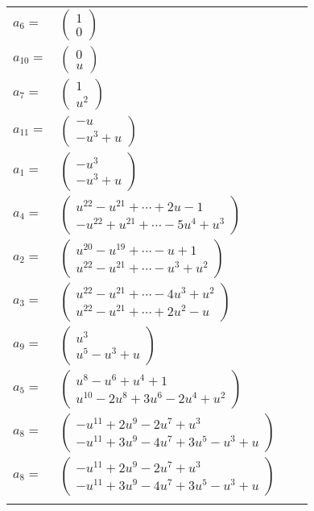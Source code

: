 \documentclass[1p]{elsarticle_modified}
\theoremstyle{definition}
\begin{document}
\begin{tabular}{m{7pt} m{180pt} m{7pt} m{180pt} }
\flushright $a_{6}=$&$\begin{pmatrix}1\\0\end{pmatrix}$ \\
\flushright $a_{10}=$&$\begin{pmatrix}0\\u\end{pmatrix}$ \\
\flushright $a_{7}=$&$\begin{pmatrix}1\\u^2\end{pmatrix}$ \\
\flushright $a_{11}=$&$\begin{pmatrix}- u\\- u^3+u\end{pmatrix}$ \\
\flushright $a_{1}=$&$\begin{pmatrix}- u^3\\- u^3+u\end{pmatrix}$ \\
\flushright $a_{4}=$&$\begin{pmatrix}u^{22}- u^{21}+\cdots+2 u-1\\- u^{22}+u^{21}+\cdots-5 u^4+u^3\end{pmatrix}$ \\
\flushright $a_{2}=$&$\begin{pmatrix}u^{20}- u^{19}+\cdots- u+1\\u^{22}- u^{21}+\cdots- u^3+u^2\end{pmatrix}$ \\
\flushright $a_{3}=$&$\begin{pmatrix}u^{22}- u^{21}+\cdots-4 u^3+u^2\\u^{22}- u^{21}+\cdots+2 u^2- u\end{pmatrix}$ \\
\flushright $a_{9}=$&$\begin{pmatrix}u^3\\u^5- u^3+u\end{pmatrix}$ \\
\flushright $a_{5}=$&$\begin{pmatrix}u^8- u^6+u^4+1\\u^{10}-2 u^8+3 u^6-2 u^4+u^2\end{pmatrix}$ \\
\flushright $a_{8}=$&$\begin{pmatrix}- u^{11}+2 u^9-2 u^7+u^3\\- u^{11}+3 u^9-4 u^7+3 u^5- u^3+u\end{pmatrix}$\\ \flushright $a_{8}=$&$\begin{pmatrix}- u^{11}+2 u^9-2 u^7+u^3\\- u^{11}+3 u^9-4 u^7+3 u^5- u^3+u\end{pmatrix}$\\&\end{tabular}
\end{document}

